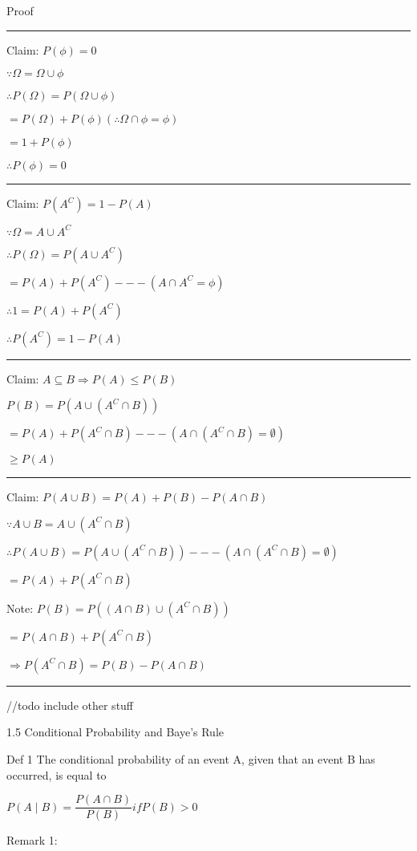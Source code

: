 \documentclass[12pt]{article}
\newcommand{\divider}[0]{\rule{\textwidth}{0.1pt}}
\begin{document}
Proof

\divider

Claim: \(P(\phi) = 0\)

\(\because \Omega = \Omega \cup \phi\)

\(\therefore P(\Omega) = P(\Omega \cup \phi)\)

\(= P(\Omega) + P(\phi) (\therefore \Omega \cap \phi = \phi)\)

\(= 1+ P(\phi)\)

\(\therefore P(\phi) = 0\)

\divider

Claim: \(P(A^C) = 1 - P(A)\)

\(\because \Omega = A \cup A^C\)

\(\therefore P(\Omega) = P(A \cup A^C)\)

\(= P(A) + P(A^C) --- (A \cap A^C = \phi)\)

\(\therefore 1 = P(A) + P(A^C)\)

\(\therefore P(A^C) = 1 - P(A)\)

\divider

Claim: \(A \subseteq B \Rightarrow P(A) \le P(B)\)

\(P(B) = P(A \cup (A^C \cap B))\)

\(= P(A) + P(A^C \cap B) --- (A \cap (A^C \cap B) = \emptyset)\)

\(\ge P(A)\)

\divider

Claim: \(P(A \cup B) = P(A) + P(B) - P(A \cap B)\)

\(\because A \cup B = A \cup (A^C \cap B)\)

\(\therefore P(A \cup B) = P(A \cup (A^C \cap B)) --- (A \cap (A^C \cap B) = \emptyset)\)

\(= P(A) + P(A^C \cap B)\)

Note: \(P(B) = P((A \cap B) \cup (A^C \cap B))\)

\(= P(A \cap B) + P(A^C \cap B)\)

\(\Rightarrow P(A^C \cap B) = P(B) - P(A \cap B)\)

\divider

//todo include other stuff

1.5 Conditional Probability and Baye's Rule

Def 1 The conditional probability of an event A, given that an event B has occurred, is equal to

\(P(A \mid B) = \dfrac{P(A \cap B)}{P(B)} if P(B) > 0\)

Remark 1:
\end{document}
